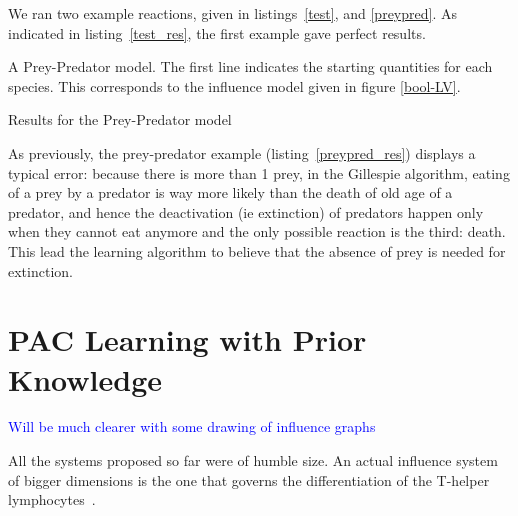 \documentclass{llncs}
\newcommand{\francois}[1]{\textcolor{blue}{#1}}
\begin{document}
We ran two example reactions, given in listings~\ref{test}, and \ref{preypred}. As indicated in listing~\ref{test_res}, the first example gave perfect results.

\begin{listfig}[hp]
	
	\vspace{-1em}
	\caption{A Prey-Predator model. The first line indicates the starting quantities for each species. This corresponds to the influence model given in figure \ref{bool-LV}.\label{preypred}}
\end{listfig}
\begin{listfig}[hp]
	
	\vspace{-1em}
	\caption{Results for the Prey-Predator model\label{preypred_res}}
\end{listfig}

As previously, the prey-predator example (listing~\ref{preypred_res}) displays a typical error: because there is more than 1 prey, in the Gillespie algorithm, eating of a prey by a predator is way more likely than the death of old age of a predator, and hence the deactivation (ie extinction) of predators happen only when they cannot eat anymore and the only possible reaction is the third: death. This lead the learning algorithm to believe that the absence of prey is needed for extinction.


\section{PAC Learning with Prior Knowledge}

\francois{Will be much clearer with some drawing of influence graphs}

All the systems proposed so far were of humble size. An actual influence
system of bigger dimensions is the one that governs the differentiation of the
T-helper lymphocytes~\cite{RRMTC06tcsb}.
\end{document}
